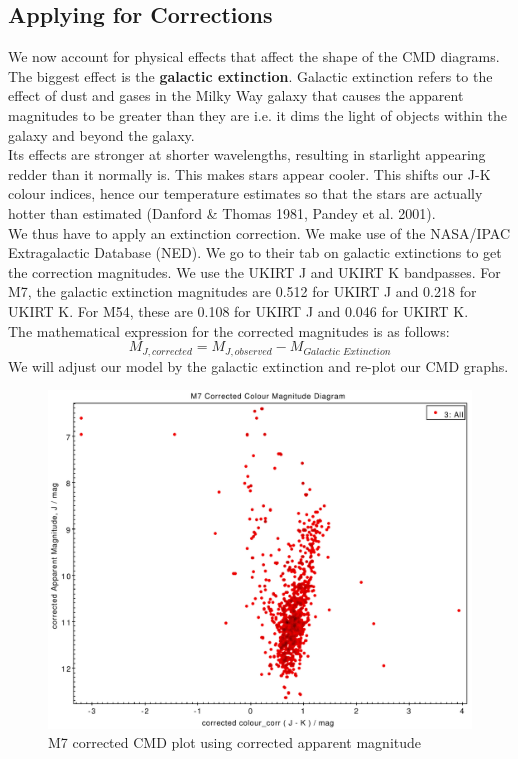 \documentclass[12pt, twocolumn]{aastex62}
\begin{document}
	\subsection{Applying for Corrections}
	We now account for physical effects that affect the shape of the CMD diagrams. The biggest effect is the \textbf{galactic extinction}. Galactic extinction refers to the effect of dust and gases in the Milky Way galaxy that causes the apparent magnitudes to be greater than they are i.e. it dims the light of objects within the galaxy and beyond the galaxy.\\
	Its effects are stronger at shorter wavelengths, resulting in starlight appearing redder than it normally is. This makes stars appear cooler. This shifts our J-K colour indices, hence our temperature estimates so that the stars are actually hotter than estimated (Danford \& Thomas 1981, Pandey et al.  2001).\\
	We thus have to apply an extinction correction. We make use of the NASA/IPAC Extragalactic Database (NED). We go to their tab on galactic extinctions to get the correction magnitudes. We use the UKIRT J and UKIRT K bandpasses. For M7, the galactic extinction magnitudes are 0.512 for UKIRT J and 0.218 for UKIRT K. For M54, these are 0.108 for UKIRT J and 0.046 for UKIRT K.\\
	The mathematical expression for the corrected magnitudes is as follows:
	\[M_{J, corrected} = M_{J, observed} - M_{Galactic \,\, Extinction}\]
	We will adjust our model by the galactic extinction and re-plot our CMD graphs.
	\begin{figure}
		\includegraphics[scale=0.34]{m7_cmd_corrected_apparent}
		\caption{M7 corrected CMD plot using corrected apparent magnitude}
		\label{fig: m7_cmd_corrected}
	\end{figure}
\end{document}

